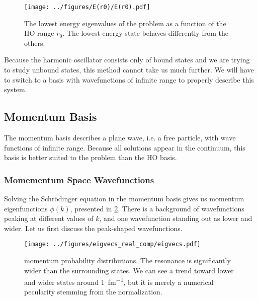 \documentclass[../main/report.tex]{subfiles}
\begin{document}

\begin{figure}[ht]
  \centering
 	\texttt{[image: ../figures/E(r0)/E(r0).pdf]}
  \caption{The lowest energy eigenvalues of the  problem as a function of the HO range $r_0$. The lowest energy state behaves differently from the others.}
  \label{fig:energies(r0)}
\end{figure}


Because the harmonic oscillator consists only of bound states and we are trying to study unbound states, this method cannot take us much further.
We will have to switch to a basis with wavefunctions of infinite range to properly describe this system.

\subsection{Momentum Basis}
\label{sub:momentum_basis}

The momentum basis describes a plane wave, i.e. a free particle, with wave functions of infinite range.
Because all  solutions appear in the continuum, this basis is better suited to the problem than the HO basis.

\subsubsection{Momementum Space Wavefunctions}

Solving the Schrödinger equation in the momentum basis gives us momentum eigenfunctions $\phi(k)$, presented in \cref{fig:real_momentum_wavefunctions}.
There is a background of wavefunctions peaking at different values of $k$, and one wavefunction standing out as lower and wider. Let us first discuss the peak-shaped wavefunctions.


\begin{figure}[h]
  \centering
  	\texttt{[image: ../figures/eigvecs\_real\_comp/eigvecs.pdf]}

  \caption{ momentum probability distributions. The resonance is significantly wider than the surrounding states. We can see a trend toward lower and wider states around \SI{1}{fm^{-1}}, but it is merely a numerical pecularity stemming from the normalization.} 
  \label{fig:real_momentum_wavefunctions}
\end{figure}
\end{document}
